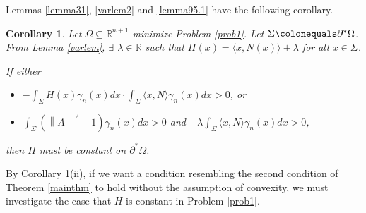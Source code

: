 \documentclass[12pt,reqno]{amsart}
\newtheorem{lemma}[theorem]{Lemma}
\newtheorem{cor}[theorem]{Corollary}
\theoremstyle{definition}
\renewcommand{\subset}{\subseteq}
\newcommand{\vnormt}[1]{\left\|#1\right\|}    %
\newcommand{\R}{\mathbb{R}}
\newcommand{\snote}[1]{\textcolor{red}{\small {\textbf{(}#1\textbf{) }}}}
\newcommand{\redA}{\partial^{*}\Omega}
\newcommand{\sdimn}{n}
\newcommand{\adimn}{n+1}
\newcommand{\scon}{\lambda}
\begin{document}


Lemmas \ref{lemma31}, \ref{varlem2} and \ref{lemma95.1} have the following corollary.

\begin{cor}\label{cor9}
Let $\Omega\subset\R^{\adimn}$ minimize Problem \ref{prob1}.  Let $\Sigma\colonequals\redA$.  From Lemma \ref{varlem}, $\exists$ $\scon\in\R$ such that $H(x)=\langle x,N(x)\rangle+\scon$ for all $x\in\Sigma$.

If either
\begin{itemize}
\item[(i)] $-\int_{\Sigma}H(x)\gamma_{\sdimn}(x)dx\cdot \int_{\Sigma}\langle x,N\rangle\gamma_{\sdimn}(x)dx>0$, or
\item[(ii)] $\int_{\Sigma}(\vnormt{A}^{2}-1)\gamma_{\sdimn}(x)dx>0$ and $-\scon\int_{\Sigma}\langle x,N\rangle\gamma_{\sdimn}(x)dx>0$,
\end{itemize}
then $H$ must be constant on $\redA$.
\end{cor}

By Corollary \ref{cor9}(ii), if we want a condition resembling the second condition of Theorem \ref{mainthm} to hold without the assumption of convexity, we must investigate the case that $H$ is constant in Problem \ref{prob1}.
\end{document}
